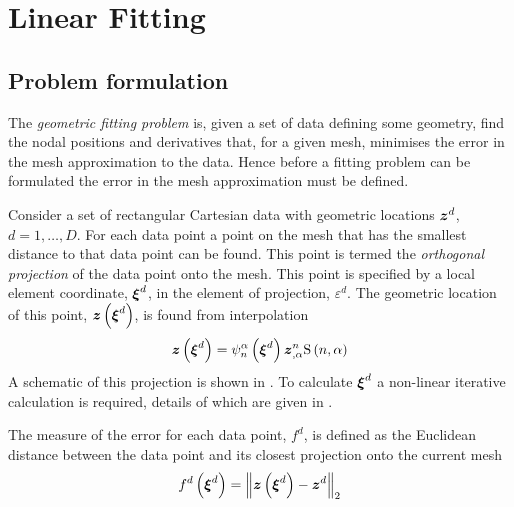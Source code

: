 \section{Linear Fitting}

\subsection{Problem formulation}

The \emph{geometric fitting problem} is, given a set of data defining some
geometry, find the nodal positions and derivatives that, for a given mesh,
minimises the error in the mesh approximation to the data. Hence before a
fitting problem can be formulated the error in the mesh approximation must be
defined.

Consider a set of rectangular Cartesian data with geometric locations
$ \boldsymbol{z} ^{d}$, $d=1,\ldots,D$. For each data point a point on the mesh
that has the smallest distance to that data point can be found. This point is
termed the \emph{orthogonal projection} of the data point onto the mesh. This
point is specified by a local element coordinate, $\vect{\xi}^{d}$, in
the element of projection, $\varepsilon^{d}$. The geometric location of
this point, $\fnof{\vectr{z}}{\vect{\xi}^{d}}$, is found from
interpolation \ie
\begin{equation}
  \fnof{\vectr{z}}{\vect{\xi}^{d}}=\gbfn{n}{\alpha}{\vectr{\xi}^{d}}
  \vectr{z}^{n}_{,\alpha}\gsf{n}{\alpha}
  \label{eqn:dataprojectionpos}
\end{equation}
A schematic of this projection is shown in .  To
calculate $ \boldsymbol{\xi} ^{d}$ a non-linear iterative calculation is
required, details of which are given in .


The measure of the error for each data point, $f^{d}$, is defined as the
Euclidean distance between the data point and its closest projection onto the
current mesh \ie
\begin{equation}
  \fnof{f^{d}}{\vectr{\xi}^{d}}=\norm{\fnof{\vectr{z}}{\vect{\xi}^{d}}-\vect{z}^{d}}
\end{equation}


